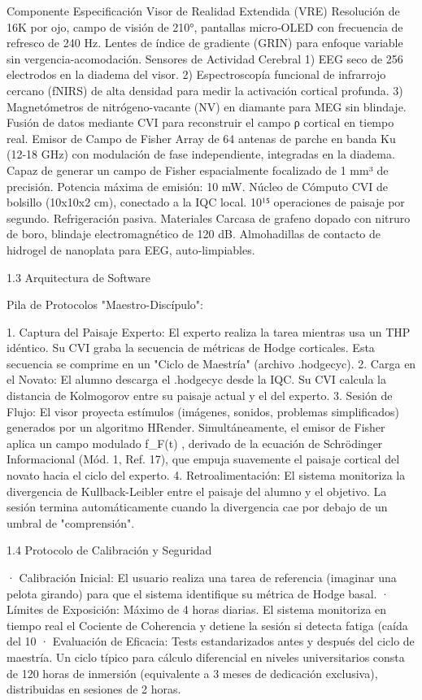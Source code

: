 \documentclass[12pt,a4paper]{book}
\begin{document}
Componente Especificación
Visor de Realidad Extendida (VRE) Resolución de 16K por ojo, campo de visión de 210°, pantallas micro‑OLED con frecuencia de refresco de 240 Hz. Lentes de índice de gradiente (GRIN) para enfoque variable sin vergencia-acomodación.
Sensores de Actividad Cerebral 1) EEG seco de 256 electrodos en la diadema del visor. 2) Espectroscopía funcional de infrarrojo cercano (fNIRS) de alta densidad para medir la activación cortical profunda. 3) Magnetómetros de nitrógeno-vacante (NV) en diamante para MEG sin blindaje. Fusión de datos mediante CVI para reconstruir el campo ρ cortical en tiempo real.
Emisor de Campo de Fisher Array de 64 antenas de parche en banda Ku (12-18 GHz) con modulación de fase independiente, integradas en la diadema. Capaz de generar un campo de Fisher espacialmente focalizado de 1 mm³ de precisión. Potencia máxima de emisión: 10 mW.
Núcleo de Cómputo CVI de bolsillo (10x10x2 cm), conectado a la IQC local. 10¹⁵ operaciones de paisaje por segundo. Refrigeración pasiva.
Materiales Carcasa de grafeno dopado con nitruro de boro, blindaje electromagnético de 120 dB. Almohadillas de contacto de hidrogel de nanoplata para EEG, auto‑limpiables.

1.3 Arquitectura de Software

Pila de Protocolos "Maestro-Discípulo":

1. Captura del Paisaje Experto: El experto realiza la tarea mientras usa un THP idéntico. Su CVI graba la secuencia de métricas de Hodge corticales. Esta secuencia se comprime en un "Ciclo de Maestría" (archivo .hodgecyc).
2. Carga en el Novato: El alumno descarga el .hodgecyc desde la IQC. Su CVI calcula la distancia de Kolmogorov entre su paisaje actual y el del experto.
3. Sesión de Flujo: El visor proyecta estímulos (imágenes, sonidos, problemas simplificados) generados por un algoritmo HRender. Simultáneamente, el emisor de Fisher aplica un campo modulado  f_F(t) , derivado de la ecuación de Schrödinger Informacional (Mód. 1, Ref. 17), que empuja suavemente el paisaje cortical del novato hacia el ciclo del experto.
4. Retroalimentación: El sistema monitoriza la divergencia de Kullback-Leibler entre el paisaje del alumno y el objetivo. La sesión termina automáticamente cuando la divergencia cae por debajo de un umbral de "comprensión".

1.4 Protocolo de Calibración y Seguridad

· Calibración Inicial: El usuario realiza una tarea de referencia (imaginar una pelota girando) para que el sistema identifique su métrica de Hodge basal.
· Límites de Exposición: Máximo de 4 horas diarias. El sistema monitoriza en tiempo real el Cociente de Coherencia y detiene la sesión si detecta fatiga (caída del 10%
· Evaluación de Eficacia: Tests estandarizados antes y después del ciclo de maestría. Un ciclo típico para cálculo diferencial en niveles universitarios consta de 120 horas de inmersión (equivalente a 3 meses de dedicación exclusiva), distribuidas en sesiones de 2 horas.
\end{document}
